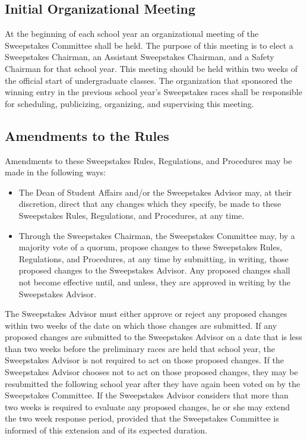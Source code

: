 \subsection{Initial Organizational Meeting}

	At the beginning of each school year an organizational meeting of the Sweepstakes Committee shall be held. The purpose of this meeting is to elect a Sweepstakes Chairman, an Assistant Sweepstakes Chairman, and a Safety Chairman for that school year. This meeting should be held within two weeks of the official start of undergraduate classes. The organization that sponsored the winning entry in the previous school year's Sweepstakes races shall be responsible for scheduling, publicizing, organizing, and supervising this meeting.

\subsection{Amendments to the Rules}

	Amendments to these Sweepstakes Rules, Regulations, and Procedures may be made in the following ways:

	\begin{itemize}

		\item
		The Dean of Student Affairs and/or the Sweepstakes Advisor may, at their discretion, direct that any changes which they specify, be made to these Sweepstakes Rules, Regulations, and Procedures, at any time.

		\item
		Through the Sweepstakes Chairman, the Sweepstakes Committee may, by a majority vote of a quorum, propose changes to these Sweepstakes Rules, Regulations, and Procedures, at any time by submitting, in writing, those proposed changes to the Sweepstakes Advisor. Any proposed changes shall not become effective until, and unless, they are approved in writing by the Sweepstakes Advisor.

	\end{itemize}

	The Sweepstakes Advisor must either approve or reject any proposed changes within two weeks of the date on which those changes are submitted. If any proposed changes are submitted to the Sweepstakes Advisor on a date that is less than two weeks before the preliminary races are held that school year, the Sweepstakes Advisor is not required to act on those proposed changes. If the Sweepstakes Advisor chooses not to act on those proposed changes, they may be resubmitted the following school year after they have again been voted on by the Sweepstakes Committee. If the Sweepstakes Advisor considers that more than two weeks is required to evaluate any proposed changes, he or she may extend the two week response period, provided that the Sweepstakes Committee is informed of this extension and of its expected duration.

